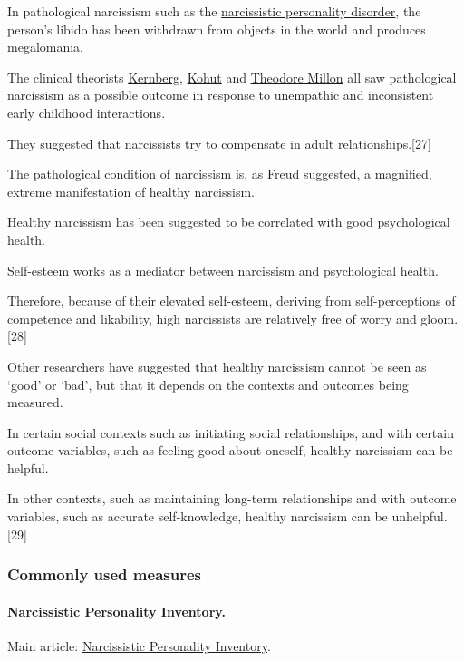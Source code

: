 \documentclass[oneside]{book}
\numberwithin{equation}{section}
\begin{document}
In pathological narcissism such as the \href{https://en.wikipedia.org/wiki/Narcissistic_personality_disorder}{narcissistic personality disorder}, the person's libido has been withdrawn from objects in the world and produces \href{https://en.wikipedia.org/wiki/Megalomania}{megalomania}.

The clinical theorists \href{https://en.wikipedia.org/wiki/Kernberg}{Kernberg}, \href{https://en.wikipedia.org/wiki/Kohut}{Kohut} and \href{https://en.wikipedia.org/wiki/Theodore_Millon}{Theodore Millon} all saw pathological narcissism as a possible outcome in response to unempathic and inconsistent early childhood interactions.

They suggested that narcissists try to compensate in adult relationships.[27]

The pathological condition of narcissism is, as Freud suggested, a magnified, extreme manifestation of healthy narcissism.

%
Healthy narcissism has been suggested to be correlated with good psychological health.

\href{https://en.wikipedia.org/wiki/Self-esteem}{Self-esteem} works as a mediator between narcissism and psychological health.

Therefore, because of their elevated self-esteem, deriving from self-perceptions of competence and likability, high narcissists are relatively free of worry and gloom.[28]

%
Other researchers have suggested that healthy narcissism cannot be seen as `good' or `bad', but that it depends on the contexts and outcomes being measured.

In certain social contexts such as initiating social relationships, and with certain outcome variables, such as feeling good about oneself, healthy narcissism can be helpful.

In other contexts, such as maintaining long-term relationships and with outcome variables, such as accurate self-knowledge, healthy narcissism can be unhelpful.[29]

\subsubsection{Commonly used measures}

\paragraph{Narcissistic Personality Inventory.} Main article: \href{https://en.wikipedia.org/wiki/Narcissistic_Personality_Inventory}{Narcissistic Personality Inventory}.
\end{document}
